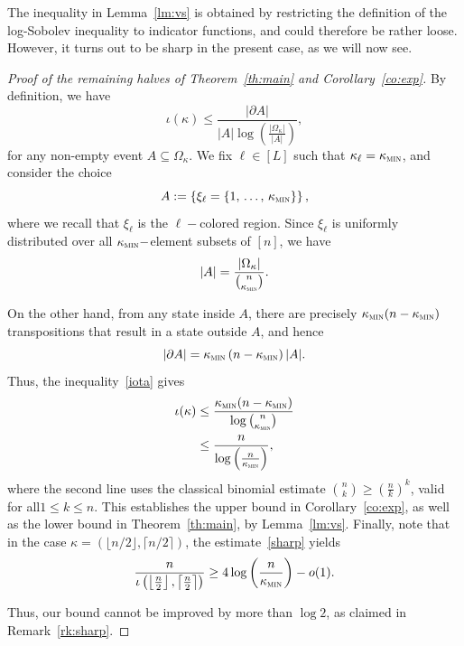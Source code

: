 \documentclass[10pt]{amsart}
\theoremstyle{definition}\newtheorem{defi}[theo]{Definition}\newtheorem{rema}[theo]{Remark}\newtheorem{exam}[theo]{Example}\newtheorem{exem}[theo]{Example}\newtheorem{nota}[theo]{Notation}
\newcommand{\am}{{\kappa_{\textsc{min}}}}
\begin{document}
The inequality in Lemma~\ref{lm:vs} is obtained by restricting the definition of the log-Sobolev inequality to indicator functions, and could therefore be rather loose. However, it turns out to be sharp in the present case, as we will now see.
\begin{proof}[Proof of the remaining halves of Theorem~\ref{th:main} and Corollary~\ref{co:exp}]By definition, we have
\begin{equation}\label{iota}
\iota(\kappa) \le \frac{|\partial A|}{|A|\log\left(\frac{|\Omega_\kappa|}{|A|}\right)},
\end{equation}
for any non-empty event $A\subseteq \Omega_\kappa$. We fix $\ell\in[L]$ such that $\kappa_\ell=\am$, and consider the choice
\begin{equation}\label{def:A}
A := \left\{\xi_\ell = \{1,\,\ldots,\,\am\} \right\},
\end{equation}
where we recall that $\xi_\ell$ is the $\ell-$colored region. Since $\xi_\ell$ is uniformly distributed over all $\am-$element subsets of $[n]$, we have
\[
|A| = \frac{|\Omega_\kappa|}{\binom{n}{\am}}.
\]

On the other hand, from any state inside $A$, there are precisely $\am(n-\am)$ transpositions that result in a state outside $A$, and hence
\[
|\partial A| = \am\left(n-\am\right)|A|.
\]
Thus, the inequality~\eqref{iota} gives
\begin{align}\label{sharp}
\iota(\kappa) & \le \frac{\am(n-\am)}{\log\binom{n}{\am}}\\
\nonumber & \le \frac{n}{\log{\left(\frac{n}{\am}\right)}},
\end{align}
where the second line uses the classical binomial estimate $\binom{n}{k}\ge (\frac{n}{k})^k$, valid for all\linebreak$1\le k\le n$. This establishes the upper bound in Corollary~\ref{co:exp}, as well as the lower bound in Theorem~\ref{th:main}, by Lemma~\ref{lm:vs}. Finally, note that in the case $\kappa=(\lfloor n/2\rfloor,\lceil n/2\rceil)$, the estimate~\eqref{sharp} yields
\begin{equation}\label{sharpiota}
\frac{n}{\iota\left(\left\lfloor \frac n2\right\rfloor,\left\lceil \frac n2\right\rceil\right)} \ge 4\log\left(\frac{n}{\am}\right)-o(1).
\end{equation}

Thus, our bound cannot be improved by more than $\log 2$, as claimed in Remark~\ref{rk:sharp}.
\end{proof}
\end{document}
